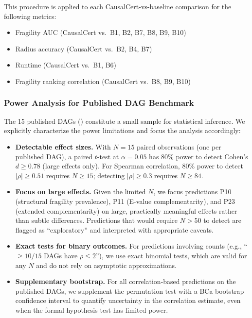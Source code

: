 \documentclass[11pt,a4paper]{article}
\theoremstyle{definition}
\theoremstyle{remark}
\newcommand{\radius}{\rho}
\begin{document}
\noindent This procedure is applied to each CausalCert-vs-baseline
comparison for the following metrics:
\begin{itemize}
  \item Fragility AUC (CausalCert vs.\ B1, B2, B7, B8, B9, B10)
  \item Radius accuracy (CausalCert vs.\ B2, B4, B7)
  \item Runtime (CausalCert vs.\ B1, B6)
  \item Fragility ranking correlation (CausalCert vs.\ B8, B9, B10)
\end{itemize}

\subsubsection{Power Analysis for Published DAG Benchmark}

The 15 published DAGs () constitute a small
sample for statistical inference. We explicitly characterize the
power limitations and focus the analysis accordingly:

\begin{itemize}
  \item \textbf{Detectable effect sizes.} With $N = 15$ paired
    observations (one per published DAG), a paired $t$-test at
    $\alpha = 0.05$ has $80\%$ power to detect Cohen's $d \geq 0.78$
    (large effects only). For Spearman correlation, $80\%$ power to
    detect $|\rho| \geq 0.51$ requires $N \geq 15$; detecting
    $|\rho| \geq 0.3$ requires $N \geq 84$.
  \item \textbf{Focus on large effects.} Given the limited $N$, we
    focus predictions P10 (structural fragility prevalence), P11
    (E-value complementarity), and P23 (extended complementarity) on
    large, practically meaningful effects rather than subtle differences.
    Predictions that would require $N > 50$ to detect are flagged as
    ``exploratory'' and interpreted with appropriate caveats.
  \item \textbf{Exact tests for binary outcomes.} For predictions
    involving counts (e.g., ``$\geq 10/15$ DAGs have $\radius \leq 2$''),
    we use exact binomial tests, which are valid for any $N$ and do not
    rely on asymptotic approximations.
  \item \textbf{Supplementary bootstrap.} For all correlation-based
    predictions on the published DAGs, we supplement the permutation test
    with a BCa bootstrap confidence interval to quantify uncertainty in
    the correlation estimate, even when the formal hypothesis test has
    limited power.
\end{itemize}
\end{document}
